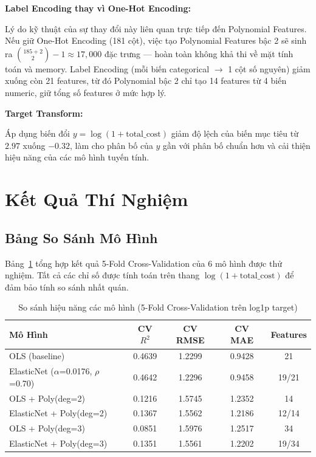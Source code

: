 \documentclass[12pt,a4paper]{article}
\begin{document}
\textbf{Label Encoding thay vì One-Hot Encoding:}

Lý do kỹ thuật của sự thay đổi này liên quan trực tiếp đến Polynomial Features. Nếu giữ One-Hot Encoding (181 cột), việc tạo Polynomial Features bậc 2 sẽ sinh ra $\binom{185+2}{2} - 1 \approx 17{,}000$ đặc trưng — hoàn toàn không khả thi về mặt tính toán và memory. Label Encoding (mỗi biến categorical $\rightarrow$ 1 cột số nguyên) giảm xuống còn 21 features, từ đó Polynomial bậc 2 chỉ tạo 14 features từ 4 biến numeric, giữ tổng số features ở mức hợp lý.

\textbf{Target Transform:}

Áp dụng biến đổi $y = \log(1 + \text{total\_cost})$ giảm độ lệch của biến mục tiêu từ $2.97$ xuống $-0.32$, làm cho phân bố của $y$ gần với phân bố chuẩn hơn và cải thiện hiệu năng của các mô hình tuyến tính.

\section{Kết Quả Thí Nghiệm}

\subsection{Bảng So Sánh Mô Hình}

Bảng~\ref{tab:comparison} tổng hợp kết quả 5-Fold Cross-Validation của 6 mô hình được thử nghiệm. Tất cả các chỉ số được tính toán trên thang $\log(1+\text{total\_cost})$ để đảm bảo tính so sánh nhất quán.

\begin{table}[H]
\centering
\caption{So sánh hiệu năng các mô hình (5-Fold Cross-Validation trên log1p target)}
\label{tab:comparison}
\begin{tabular}{l c c c c}
\toprule
\textbf{Mô Hình} & \textbf{CV $R^2$} & \textbf{CV RMSE} & \textbf{CV MAE} & \textbf{Features} \\
\midrule
OLS (baseline)                     & 0.4639 & 1.2299 & 0.9428 & 21 \\
ElasticNet ($\alpha$=0.0176, $\rho$=0.70) & 0.4642 & 1.2296 & 0.9458 & 19/21 \\
OLS + Poly(deg=2)                  & 0.1216 & 1.5745 & 1.2352 & 14 \\
ElasticNet + Poly(deg=2)           & 0.1367 & 1.5562 & 1.2186 & 12/14 \\
OLS + Poly(deg=3)                  & 0.0851 & 1.5976 & 1.2517 & 34 \\
ElasticNet + Poly(deg=3)           & 0.1351 & 1.5561 & 1.2202 & 19/34 \\
\bottomrule
\end{tabular}
\end{table}
\end{document}
